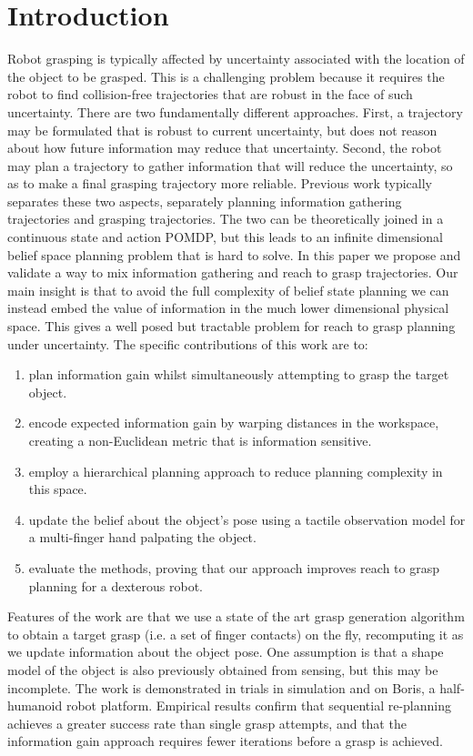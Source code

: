 \section{Introduction}
\label{sec:intro}

Robot grasping is typically affected by uncertainty associated with the location of the object to be grasped.  This is a challenging problem because it requires the robot to find collision-free trajectories that are robust in the face of such uncertainty. There are two fundamentally different approaches. First, a trajectory may be formulated that is robust to current uncertainty, but does not reason about how future information may reduce that uncertainty. Second, the robot may plan a trajectory to gather information that will reduce the uncertainty, so as to make a final grasping trajectory more reliable.
Previous work typically separates these two aspects, separately planning information gathering trajectories and grasping trajectories. The two can be theoretically joined in a continuous state and action POMDP, but this leads to an infinite dimensional belief space planning problem that is hard to solve. In this paper we propose and validate a way to mix information gathering and reach to grasp trajectories.  Our main insight is that to avoid the full complexity of belief state planning we can instead embed the value of information in the much lower dimensional physical space. This gives a well posed but tractable problem for reach to grasp planning under uncertainty. The specific contributions of this work are to:
\begin{enumerate}
\item plan information gain whilst simultaneously attempting to grasp the target object.
\item encode expected information gain by warping distances in the workspace, creating a non-Euclidean metric that is information sensitive.
\item employ a hierarchical planning approach to reduce planning complexity in this space.
\item update the belief about the object's pose using a tactile observation model for a multi-finger hand palpating the object.
\item evaluate the methods, proving that our approach improves reach to grasp planning for a dexterous robot.
\end{enumerate}

Features of the work are that we use a state of the art grasp generation algorithm to obtain a target grasp (i.e. a set of finger contacts) on the fly, recomputing it as we update information about the object pose. One assumption is that a shape model of the object is also previously obtained from sensing, but this may be incomplete. The work is demonstrated in trials in simulation and on Boris, a half-humanoid robot platform. Empirical results confirm that sequential re-planning achieves a greater success rate than single grasp attempts, and that the information gain approach requires fewer iterations before a grasp is achieved.  


